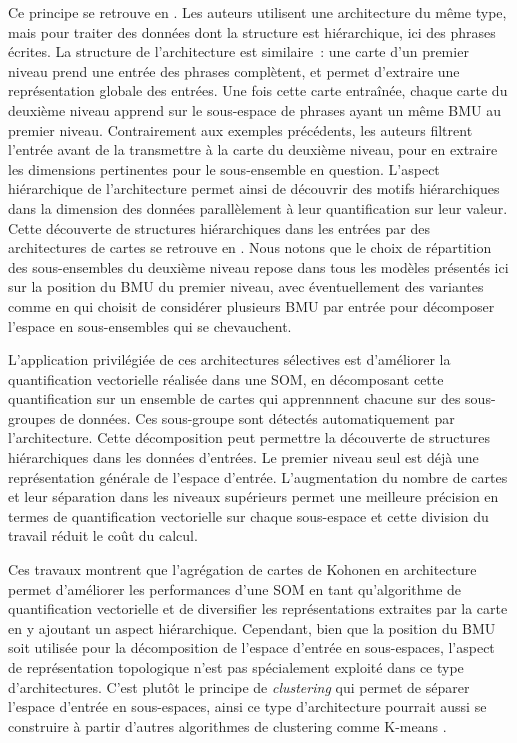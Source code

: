 \documentclass[../main]{subfiles}
\begin{document}
Ce principe se retrouve en \cite{miikkulainen_script_1992}. 
Les auteurs utilisent une architecture du même type, mais pour traiter des données dont la structure est hiérarchique, ici des phrases écrites. La structure de l'architecture est similaire~: une carte d'un premier niveau prend une entrée des phrases complètent, et permet d'extraire une représentation globale des entrées. Une fois cette carte entraînée, chaque carte du deuxième niveau apprend sur le sous-espace de phrases ayant un même BMU au premier niveau. Contrairement aux exemples précédents, les auteurs filtrent l'entrée avant de la transmettre à la carte du deuxième niveau, pour en extraire les dimensions pertinentes pour le sous-ensemble en question. L'aspect hiérarchique de l'architecture permet ainsi de découvrir des motifs hiérarchiques dans la dimension des données parallèlement à leur quantification sur leur valeur.
Cette découverte de structures hiérarchiques dans les entrées par des architectures de cartes se retrouve en \cite{ordonez_hierarchical_2010,dittenbach_growing_2000}.
Nous notons que le choix de répartition des sous-ensembles du deuxième niveau repose dans tous les modèles présentés ici sur la position du BMU du premier niveau, avec éventuellement des variantes comme en \cite{suganthan_pattern_2001} qui choisit de considérer plusieurs BMU par entrée pour décomposer l'espace en sous-ensembles qui se chevauchent.

L'application privilégiée de ces architectures sélectives est d'améliorer la quantification vectorielle réalisée dans une SOM, en décomposant cette quantification sur un ensemble de cartes qui apprennnent chacune sur des sous-groupes de données. Ces sous-groupe sont détectés automatiquement par l'architecture.
Cette décomposition peut permettre la découverte de structures hiérarchiques dans les données d'entrées.
Le premier niveau seul est déjà une représentation générale de l'espace d'entrée. L'augmentation du nombre de cartes et leur séparation dans les niveaux supérieurs permet une meilleure précision en termes de quantification vectorielle sur chaque sous-espace et cette division du travail réduit le coût du calcul.

Ces travaux montrent que l'agrégation de cartes de Kohonen en architecture permet d'améliorer les performances d'une SOM en tant qu'algorithme de quantification vectorielle et de diversifier les représentations extraites par la carte en y ajoutant un aspect hiérarchique.
Cependant, bien que la position du BMU soit utilisée pour la décomposition de l'espace d'entrée en sous-espaces, l'aspect de représentation topologique n'est pas spécialement exploité dans ce type d'architectures.
C'est plutôt le principe de \emph{clustering} qui permet de séparer l'espace d'entrée en sous-espaces, ainsi ce type d'architecture pourrait aussi se construire à partir d'autres algorithmes de clustering comme K-means \parencite{1094577}.
\end{document}
